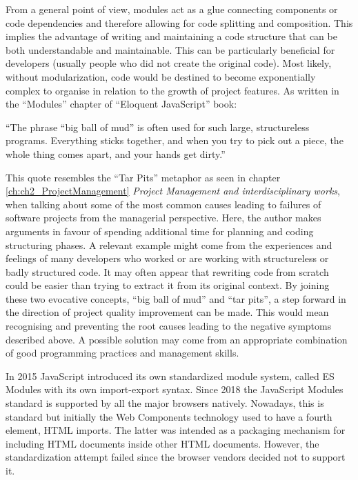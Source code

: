 From a general point of view, modules act as a glue connecting components or code dependencies and therefore allowing for code splitting and composition. This implies the advantage of writing and maintaining a code structure that can be both understandable and maintainable. This can be particularly beneficial for developers (usually people who did not create the original code). Most likely, without modularization, code would be destined to become exponentially complex to organise in relation to the growth of project features.
As written in the “Modules” chapter of “Eloquent JavaScript” book:

\begin{displayquote}

“The phrase “big ball of mud” is often used for such large, structureless programs. Everything sticks together, and when you try to pick out a piece, the whole thing comes apart, and your hands get dirty.”

\end{displayquote}

This quote resembles the “Tar Pits” metaphor as seen in chapter \ref{ch:ch2_ProjectManagement} \emph{Project Management and interdisciplinary works}, when talking about some of the most common causes leading to failures of software projects from the managerial perspective. Here, the author makes arguments in favour of spending additional time for planning and coding structuring phases. A relevant example might come from the experiences and feelings of many developers who worked or are working with structureless or badly structured code. It may often appear that rewriting code from scratch could be easier than trying to extract it from its original context. 
By joining these two evocative concepts, “big ball of mud” and “tar pits”, a step forward in the direction of project quality improvement can be made. This would mean recognising and preventing the root causes leading to the negative symptoms described above. A possible solution may come from an appropriate combination of good programming practices and management skills.

In 2015 JavaScript introduced its own standardized module system, called ES Modules with its own import-export syntax. Since 2018 the JavaScript Modules standard is supported by all the major browsers natively. Nowadays, this is standard but initially the Web Components technology used to have a fourth element, HTML imports. The latter was intended as a packaging mechanism for including HTML documents inside other HTML documents. However, the standardization attempt failed since the browser vendors decided not to support it.

